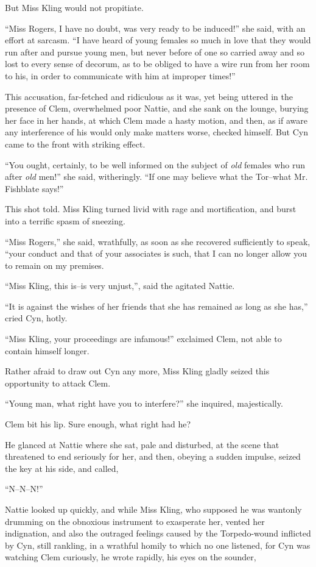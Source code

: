 But Miss Kling would not propitiate.

``Miss Rogers, I have no doubt, was very ready to be induced!'' she said,
with an effort at sarcasm. ``I have heard of young females so much in
love that they would run after and pursue young men, but never before of
one so carried away and so lost to every sense of decorum, as to be
obliged to have a wire run from her room to his, in order to communicate
with him at improper times!''

This accusation, far-fetched and ridiculous as it was, yet being uttered
in the presence of Clem, overwhelmed poor Nattie, and she sank on the
lounge, burying her face in her hands, at which Clem made a hasty
motion, and then, as if aware any interference of his would only make
matters worse, checked himself. But Cyn came to the front with striking
effect.

``You ought, certainly, to be well informed on the subject of \emph{old}
females who run after \emph{old} men!'' she said, witheringly. ``If one may
believe what the Tor--what Mr. Fishblate says!''

This shot told. Miss Kling turned livid with rage and mortification, and
burst into a terrific spasm of sneezing.

``Miss Rogers,'' she said, wrathfully, as soon as she recovered
sufficiently to speak, ``your conduct and that of your associates is such,
that I can no longer allow you to remain on my premises.

``Miss Kling, this is--is very unjust,'', said the agitated Nattie.

``It is against the wishes of her friends that she has remained as long
as she has,'' cried Cyn, hotly.

``Miss Kling, your proceedings are infamous!'' exclaimed Clem, not able to
contain himself longer.

Rather afraid to draw out Cyn any more, Miss Kling gladly seized this
opportunity to attack Clem.

``Young man, what right have you to interfere?'' she inquired,
majestically.

Clem bit his lip. Sure enough, what right had he?

He glanced at Nattie where she sat, pale and disturbed, at the scene
that threatened to end seriously for her, and then, obeying a sudden
impulse, seized the key at his side, and called,

``N--N--N!''

Nattie looked up quickly, and while Miss Kling, who supposed he was
wantonly drumming on the obnoxious instrument to exasperate her, vented
her indignation, and also the outraged feelings caused by the
Torpedo-wound inflicted by Cyn, still rankling, in a wrathful homily to
which no one listened, for Cyn was watching Clem curiously, he wrote
rapidly, his eyes on the sounder,

